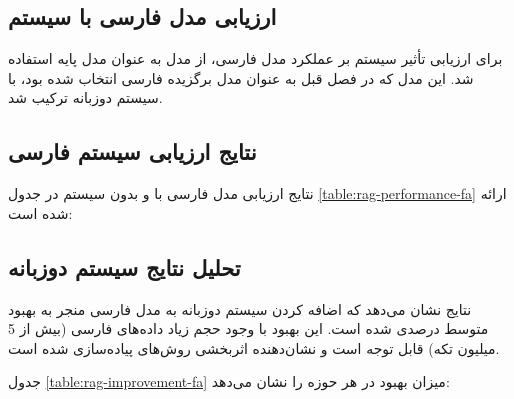 \documentclass[11pt, a4paper, oneside]{book}
\begin{document}
	\subsection{ارزیابی مدل فارسی با سیستم }
	برای ارزیابی تأثیر سیستم  بر عملکرد مدل فارسی، از مدل  به عنوان مدل پایه استفاده شد. این مدل که در فصل قبل به عنوان مدل برگزیده فارسی انتخاب شده بود، با سیستم  دوزبانه ترکیب شد.

	\subsection{نتایج ارزیابی سیستم فارسی}
	نتایج ارزیابی مدل فارسی با و بدون سیستم  در جدول \ref{table:rag-performance-fa} ارائه شده است:

	\begin{table}[htbp]
		\centering
		\caption{مقایسه عملکرد مدل فارسی با و بدون سیستم }
		\label{table:rag-performance-fa}
		\begin{latin}
		\end{latin}
	\end{table}

	\subsection{تحلیل نتایج سیستم دوزبانه}
	نتایج نشان می‌دهد که اضافه کردن سیستم  دوزبانه به مدل فارسی منجر به بهبود متوسط  درصدی شده است. این بهبود با وجود حجم زیاد داده‌های فارسی (بیش از 5 میلیون تکه) قابل توجه است و نشان‌دهنده اثربخشی روش‌های پیاده‌سازی شده است.

	جدول \ref{table:rag-improvement-fa} میزان بهبود در هر حوزه را نشان می‌دهد:
\end{document}
